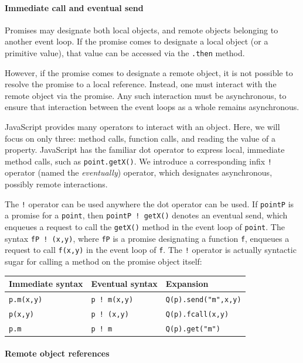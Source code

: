 \documentclass{llncs}
\begin{document}
\paragraph{Immediate call and eventual send}

Promises may designate both local objects, and remote objects belonging to another event loop. If the promise comes to designate a local object (or a primitive value), that value can be accessed via the {\tt .then} method.

However, if the promise comes to designate a remote object, it is not possible to resolve the promise to a local reference. Instead, one must interact with the remote object via the promise. Any such interaction must be asynchronous, to ensure that interaction between the event loops as a whole remains asynchronous.

JavaScript provides many operators to interact with an object. Here, we will focus on only three: method calls, function calls, and reading the value of a property. JavaScript has the familiar dot operator to express local, immediate method calls, such as {\tt point.getX()}. We introduce a corresponding infix {\tt !} operator (named the \emph{eventually}) operator, which designates asynchronous, possibly remote interactions.

The {\tt !} operator can be used anywhere the dot operator can be used. If {\tt pointP} is a promise for a {\tt point}, then {\tt pointP ! getX()} denotes an eventual send, which enqueues a request to call the {\tt getX()} method in the event loop of {\tt point}. The syntax {\tt fP ! (x,y)}, where {\tt fP} is a promise designating a function {\tt f}, enqueues a request to call {\tt f(x,y)} in the event loop of {\tt f}. The {\tt !} operator is actually syntactic sugar for calling a method on the promise object itself:

\begin{center}
  \begin{tabular}{ l | l | l }
  Immediate syntax & Eventual syntax & Expansion \\
  \hline
  {\tt p.m(x,y)} & {\tt p ! m(x,y)} & {\tt Q(p).send("m",x,y)} \\
  {\tt p(x,y)} & {\tt p ! (x,y)} & {\tt Q(p).fcall(x,y)}\\
  {\tt p.m} & {\tt p ! m} & {\tt Q(p).get("m")}\\
  \end{tabular} 
\end{center}


\paragraph{Remote object references}
\end{document}
